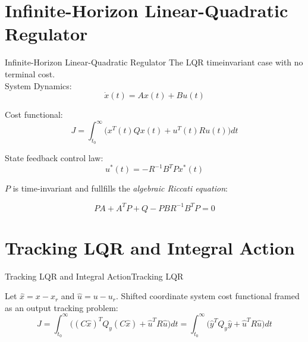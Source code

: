 \documentclass[10pt]{beamer}
\begin{document}
\section{Infinite-Horizon Linear-Quadratic Regulator}
\begin{frame}{Infinite-Horizon Linear-Quadratic Regulator}
	The LQR timeinvariant case with no terminal cost.\\
	System Dynamics:
	\begin{equation}
		\dot{x}(t) = Ax(t) + Bu(t) \label{eq:TimeInvariantLinearSystem}
	\end{equation}

	Cost functional:		
	\begin{equation}\label{eq:LagrangeProblem}
		J = \int_{t_0}^{\infty} \big(x^T(t)Qx(t) + u^T(t)Ru(t)\big)dt
	\end{equation} 

	State feedback control law:
	\begin{equation}\label{eq:InfLQRFeedbackLaw}
		u^*(t) = -R^{-1}B^TPx^*(t)
	\end{equation}
	
	$P$ is time-invariant and fullfills the \textit{algebraic Riccati equation}:
	
	\begin{equation}\label{eq:ARE}
		PA + A^TP + Q - PBR^{-1}B^TP = 0
	\end{equation}
\end{frame}

\section{Tracking LQR and Integral Action}
\begin{frame}{Tracking LQR and Integral Action}{Tracking LQR}
	 
	
	Let $\hat{x} = x-x_r$ and $\hat{u} = u-u_r$. Shifted coordinate system cost functional framed as an output tracking problem:
	\begin{equation}\label{eq:LagrangeProblemOutput}
		J = \int_{t_0}^{\infty} \big((C\hat{x})^TQ_y(C\hat{x}) + \hat{u}^TR\hat{u}\big)dt = \int_{t_0}^{\infty} \big(\hat{y}^TQ_y\hat{y} + \hat{u}^TR\hat{u}\big)dt
	\end{equation} 
\end{frame}
\end{document}
